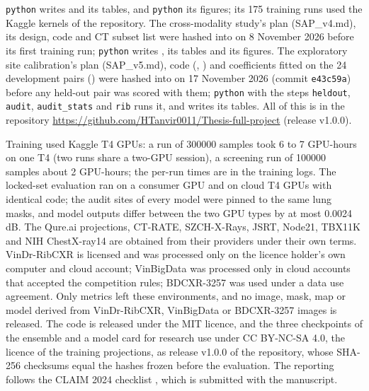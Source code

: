 \texttt{python}  writes  and its tables, and
\texttt{python}  its figures; its 175 training runs used the Kaggle kernels of the repository.
The cross-modality study's plan (SAP\_v4.md), its design, code and CT subset list were hashed into  on 8 November 2026
before its first training run; \texttt{python}  writes , 
its tables and  its figures. The exploratory site calibration's plan (SAP\_v5.md), code (,
) and coefficients fitted on the 24 development pairs () were hashed into
 on 17 November 2026 (commit \texttt{e43c59a}) before any held-out pair was scored with them; \texttt{python}
 with the steps \texttt{heldout}, \texttt{audit}, \texttt{audit\_stats} and \texttt{rib} runs it, and
 writes its tables. All of this is in the repository \url{https://github.com/HTanvir0011/Thesis-full-project}
(release v1.0.0).

Training used Kaggle T4 GPUs: a run of \num{300000} samples took 6 to 7 GPU-hours on one T4 (two runs share a two-GPU session), a screening run
of \num{100000} samples about 2 GPU-hours; the per-run times are in the training logs. The locked-set evaluation ran on a consumer GPU and on
cloud T4 GPUs with identical code; the audit sites of every model were pinned to the same lung masks, and model outputs differ between the two
GPU types by at most 0.0024\,dB.
The Qure.ai projections, CT-RATE, SZCH-X-Rays, JSRT, Node21, TBX11K and NIH ChestX-ray14 are obtained from their providers under their own terms.
VinDr-RibCXR is licensed and was processed only on the licence holder's own computer and cloud account; VinBigData was processed only in
cloud accounts that accepted the competition rules; BDCXR-3257 was used under a data use agreement. Only metrics left these environments, and no
image, mask, map or model derived from VinDr-RibCXR, VinBigData or BDCXR-3257 images is released.
The code is released under the MIT licence, and the three checkpoints of the ensemble and a model card for research use under CC BY-NC-SA 4.0,
the licence of the training projections, as release v1.0.0 of the repository, whose SHA-256 checksums equal the hashes frozen before the
evaluation.
The reporting follows the CLAIM 2024 checklist \citep{tejani2024claim}, which is submitted with the manuscript.
